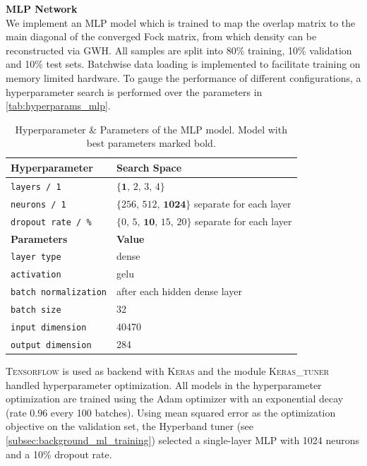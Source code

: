 \textbf{MLP Network}\\
We implement an MLP model which is trained to map the overlap matrix to the main diagonal of the converged Fock matrix, from which density can be reconstructed via GWH. All samples are split into 80\% training, 10\% validation and 10\% test sets. Batchwise data loading is implemented to facilitate training on memory limited hardware. To gauge the performance of different configurations, a hyperparameter search is performed over the parameters in \autoref{tab:hyperparams_mlp}.
\begin{table}[H]
    \caption[Hyperparameter \& Parameters of the MLP model]{Hyperparameter \& Parameters of the MLP model. Model with best parameters marked bold.}
    \label{tab:hyperparams_mlp}
    \centering
    \begin{tabular}{@{}ll@{}}
        \toprule
        \textbf{Hyperparameter}     & \textbf{Search Space}                  \\ 
        \midrule
        \texttt{layers / 1}          & $\{\textbf{1},\,2,\,3,\,4\}$                         \\
        \texttt{neurons / 1}   & $\{256,\,512,\,\textbf{1024}\}$  separate for each layer    \\
        \texttt{dropout rate / \%}   & $\{0,\,5,\,\textbf{10},\,15,\,20\}$ separate for each layer \\
        \bottomrule
        \textbf{Parameters}     & \textbf{Value}                  \\ 
        \midrule
        \texttt{layer type}          & dense                         \\
        \texttt{activation}          & gelu                         \\
        \texttt{batch normalization} & after each hidden dense layer \\
        \texttt{batch size}          & 32 \\
        \texttt{input dimension}     & 40470 \\
        \texttt{output dimension}    & 284 \\
        \bottomrule
    \end{tabular}
\end{table}
\textsc{Tensorflow} is used as backend with \textsc{Keras} and the module \textsc{Keras\_tuner} handled hyperparameter optimization. \parencite{ref:tensorflow,ref:keras,ref:kerastuner}
All models in the hyperparameter optimization are trained using the Adam optimizer with an exponential decay (rate $0.96$ every 100 batches). Using mean squared error as the optimization objective on the validation set, the Hyperband tuner (see \autoref{subsec:background_ml_training}) selected a single-layer MLP with 1024 neurons and a 10\% dropout rate.\\
